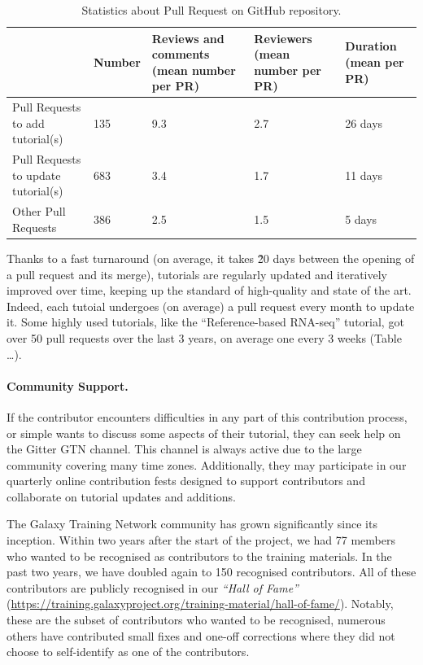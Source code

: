 \documentclass[10pt,letterpaper]{article}
\begin{document}
\begin{table}[]
\begin{adjustwidth}{-2.25in}{0in} %
	\centering
	\caption{Statistics about Pull Request on GitHub repository.\label{tbl:pullRequestReviewing}}
	\begin{tabular}{l|p{}p{}p{}p{}}
									        & Number & Reviews and comments (mean number per PR) & Reviewers (mean number per PR) & Duration (mean per PR) \\\hline
		Pull Requests to add tutorial(s)    & 135    & 9.3                                       & 2.7                            & 26 days\\
		Pull Requests to update tutorial(s) & 683    & 3.4                                       & 1.7                            & 11 days\\
		Other Pull Requests                 & 386    & 2.5                                       & 1.5                            & 5 days\\
	\end{tabular}
\end{adjustwidth}
\end{table}


Thanks to a fast turnaround (on average, it takes \~20 days between the opening of a pull request and its merge), tutorials are regularly updated and iteratively improved over time, keeping up the standard of high-quality and state of the art.
Indeed, each tutoial undergoes (on average) a pull request every month to update it. Some highly used tutorials, like the “Reference-based RNA-seq” tutorial, got over 50 pull requests over the last 3 years, on average one every 3 weeks (Table …).


\paragraph*{Community Support.} If the contributor encounters difficulties in any part of this contribution process, or simple wants to discuss some aspects of their tutorial, they can seek help on the Gitter GTN channel. This channel is always active due to the large community covering many time zones.
Additionally, they may participate in our quarterly online contribution fests designed to support contributors and collaborate on tutorial updates and additions.

The Galaxy Training Network community has grown significantly since its inception.
Within two years after the start of the project, we had 77 members who wanted to be recognised as contributors to the training materials.
In the past two years, we have doubled again to 150 recognised contributors.
All of these contributors are publicly recognised in our \emph{“Hall of Fame”} (\url{https://training.galaxyproject.org/training-material/hall-of-fame/}).
Notably, these are the subset of contributors who wanted to be recognised, numerous others have contributed small fixes and one-off corrections where they did not choose to self-identify as one of the contributors.
\end{document}
